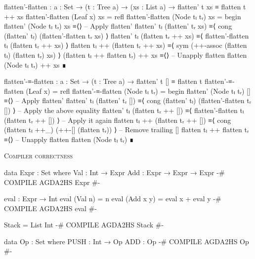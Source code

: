 \documentclass{article}
\begin{document}
\begin{code}
flatten'-flatten : {a : Set} → (t : Tree a) → (xs : List a)
    → flatten' t xs ≡ flatten t ++ xs
flatten'-flatten (Leaf x) xs = refl
flatten'-flatten (Node tₗ tᵣ) xs =
  begin
    flatten' (Node tₗ tᵣ) xs
  ≡⟨⟩ -- Apply flatten'
    flatten' tₗ (flatten' tᵣ xs)
  ≡⟨ cong (flatten' tₗ) (flatten'-flatten tᵣ xs) ⟩
    flatten' tₗ (flatten tᵣ ++ xs)
  ≡⟨ flatten'-flatten tₗ (flatten tᵣ ++ xs) ⟩
    flatten tₗ ++ (flatten tᵣ ++ xs)
  ≡⟨ sym (++-assoc (flatten tₗ) (flatten tᵣ) xs) ⟩
    (flatten tₗ ++ flatten tᵣ) ++ xs
  ≡⟨⟩ -- Unapply flatten
    flatten (Node tₗ tᵣ) ++ xs
  ∎

flatten'-≡-flatten : {a : Set} → (t : Tree a)
    → flatten' t [] ≡ flatten t
flatten'-≡-flatten (Leaf x) = refl
flatten'-≡-flatten (Node tₗ tᵣ) =
  begin
    flatten' (Node tₗ tᵣ) []
  ≡⟨⟩ -- Apply flatten'
    flatten' tₗ (flatten' tᵣ [])
  ≡⟨ cong (flatten' tₗ) (flatten'-flatten tᵣ []) ⟩ -- Apply the above equality
    flatten' tₗ (flatten tᵣ ++ [])
  ≡⟨ flatten'-flatten tₗ (flatten tᵣ ++ []) ⟩ -- Apply it again
    flatten tₗ ++ (flatten tᵣ ++ [])
  ≡⟨ cong (flatten tₗ ++_) (++-[] (flatten tᵣ)) ⟩ -- Remove trailing []
    flatten tₗ ++ flatten tᵣ
  ≡⟨⟩ -- Unapply flatten
    flatten (Node tₗ tᵣ)
  ∎
\end{code}

\noindent
\textsc{Compiler correctness}

\begin{code}
data Expr : Set where
    Val : Int → Expr
    Add : Expr → Expr → Expr
{-# COMPILE AGDA2HS Expr #-}

eval : Expr → Int
eval (Val n) = n
eval (Add x y) = eval x + eval y
{-# COMPILE AGDA2HS eval #-}

Stack = List Int
{-# COMPILE AGDA2HS Stack #-}

data Op : Set where
    PUSH : Int → Op
    ADD : Op
{-# COMPILE AGDA2HS Op #-}
\end{code}
\end{document}
